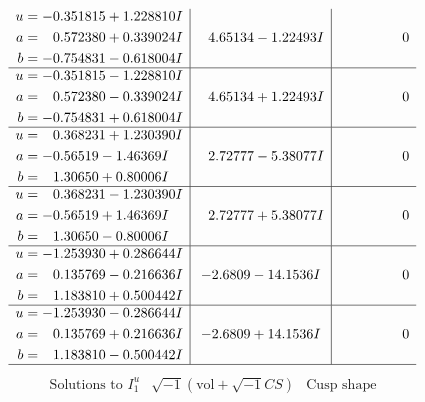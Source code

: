 \documentclass[1p]{elsarticle_modified}
\theoremstyle{definition}
\newcommand{\I}{\sqrt{-1}}
\begin{document}
$$\begin{array}{c|c|c}
\begin{aligned}
u &= -0.351815 + 1.228810 I \\
a &= \phantom{-}0.572380 + 0.339024 I \\
b &= -0.754831 - 0.618004 I\end{aligned}
 & \phantom{-}4.65134 - 1.22493 I & \phantom{-0.000000 } 0 \\ \hline\begin{aligned}
u &= -0.351815 - 1.228810 I \\
a &= \phantom{-}0.572380 - 0.339024 I \\
b &= -0.754831 + 0.618004 I\end{aligned}
 & \phantom{-}4.65134 + 1.22493 I & \phantom{-0.000000 } 0 \\ \hline\begin{aligned}
u &= \phantom{-}0.368231 + 1.230390 I \\
a &= -0.56519 - 1.46369 I \\
b &= \phantom{-}1.30650 + 0.80006 I\end{aligned}
 & \phantom{-}2.72777 - 5.38077 I & \phantom{-0.000000 } 0 \\ \hline\begin{aligned}
u &= \phantom{-}0.368231 - 1.230390 I \\
a &= -0.56519 + 1.46369 I \\
b &= \phantom{-}1.30650 - 0.80006 I\end{aligned}
 & \phantom{-}2.72777 + 5.38077 I & \phantom{-0.000000 } 0 \\ \hline\begin{aligned}
u &= -1.253930 + 0.286644 I \\
a &= \phantom{-}0.135769 - 0.216636 I \\
b &= \phantom{-}1.183810 + 0.500442 I\end{aligned}
 & -2.6809 - 14.1536 I & \phantom{-0.000000 } 0 \\ \hline\begin{aligned}
u &= -1.253930 - 0.286644 I \\
a &= \phantom{-}0.135769 + 0.216636 I \\
b &= \phantom{-}1.183810 - 0.500442 I\end{aligned}
 & -2.6809 + 14.1536 I & \phantom{-0.000000 } 0\\
 \hline 
 \end{array}$$\newpage$$\begin{array}{c|c|c}  
\text{Solutions to }I^u_{1}& \I (\text{vol} + \sqrt{-1}CS) & \text{Cusp shape}\\
 \hline 
\begin{aligned}

\end{aligned}
\end{array}$$
\end{document}
